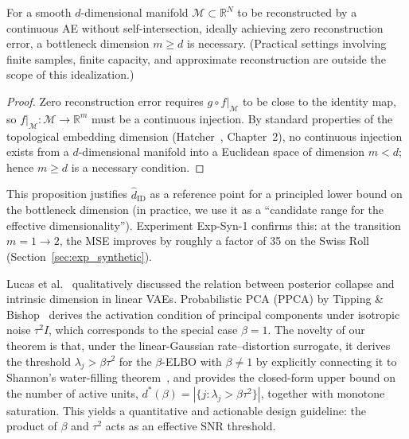 \documentclass[make,article,submit,pdftex,moreauthors]{Definitions/mdpi}
\newcommand{\R}{\mathbb{R}}
\begin{document}
\begin{Proposition}\label{thm:lower_bound}
For a smooth $d$-dimensional manifold $\mathcal{M} \subset \R^N$ to be reconstructed by
a continuous AE without self-intersection, ideally achieving zero reconstruction error,
a bottleneck dimension $m \geq d$ is necessary.
(Practical settings involving finite samples, finite capacity, and approximate
reconstruction are outside the scope of this idealization.)
\end{Proposition}

\begin{proof}
Zero reconstruction error requires $g \circ f|_\mathcal{M}$ to be close to the identity map,
so $f|_\mathcal{M}: \mathcal{M} \to \R^m$ must be a continuous injection.
By standard properties of the topological embedding dimension
(Hatcher~\cite{hatcher2002algebraic}, Chapter~2), no continuous injection exists from a
$d$-dimensional manifold into a Euclidean space of dimension $m < d$;
hence $m \geq d$ is a necessary condition.
\end{proof}

This proposition justifies $\hat{d}_\mathrm{ID}$ as a reference point for a principled
lower bound on the bottleneck dimension
(in practice, we use it as a ``candidate range for the effective dimensionality'').
Experiment Exp-Syn-1 confirms this: at the transition $m = 1 \to 2$, the MSE improves by
roughly a factor of 35 on the Swiss Roll (Section~\ref{sec:exp_synthetic}).

\begin{Remark}
Lucas et al.~\cite{lucas2019elbo} qualitatively discussed the relation between posterior
collapse and intrinsic dimension in linear VAEs.
Probabilistic PCA (PPCA) by Tipping \& Bishop~\cite{tippingbishop1999ppca} derives the
activation condition of principal components under isotropic noise $\tau^2 I$,
which corresponds to the special case $\beta = 1$.
The novelty of our theorem is that, under the linear-Gaussian rate--distortion surrogate,
it derives the threshold $\lambda_j > \beta\tau^2$ for the $\beta$-ELBO with
$\beta \neq 1$ by explicitly connecting it to Shannon's water-filling
theorem~\cite{cover2006elements}, and provides the closed-form upper bound on the number
of active units, $d^*(\beta) = |\{j:\lambda_j > \beta\tau^2\}|$, together with monotone
saturation.
This yields a quantitative and actionable design guideline: the product of $\beta$ and
$\tau^2$ acts as an effective SNR threshold.
\end{Remark}
\end{document}
